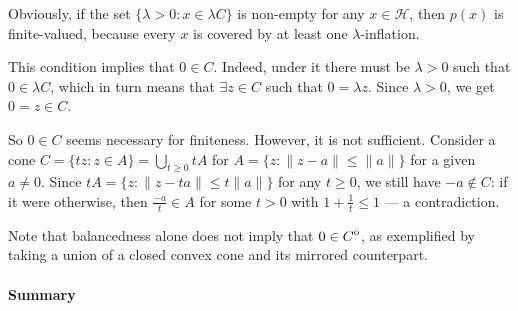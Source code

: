 \documentclass[a4paper]{article}
\newcommand{\Hcal}{\mathcal{H}}
\newcommand{\interior}[1]{%
  {\kern0pt#1}^{\mathrm{o}}%
}
\begin{document}
Obviously, if the set $\{ \lambda > 0 \colon x \in \lambda C \}$ is non-empty for
any $x \in \Hcal$, then $p(x)$ is finite-valued, because every $x$ is covered by
at least one $\lambda$-inflation.

This condition implies that $0 \in C$. Indeed, under it there must be $\lambda > 0$
such that $0 \in \lambda C$, which in turn means that $\exists z\in C$ such that
$0 = \lambda z$. Since $\lambda > 0$, we get $0 = z\in C$.

So $0 \in C$ seems necessary for finiteness. However, it is not sufficient. Consider
a cone $C = \{t z\colon z\in A\} = \bigcup_{t\geq 0} t A$ for $A = \{z\colon \|z - a\|
\leq \|a\|\}$ for a given $a \neq 0$. Since $t A = \{z\colon \|z - t a\| \leq t \|a\| \}$
for any $t\geq 0$, we still have $-a \notin C$: if it were otherwise, then $\tfrac{- a}t
\in A$ for some $t > 0$ with $1 + \tfrac1t \leq 1$ --- a contradiction.

Note that balancedness alone does not imply that $0 \in \interior{C}$, as exemplified
by taking a union of a closed convex cone and its mirrored counterpart.


\paragraph{Summary} %
\label{par:summary}
\end{document}
